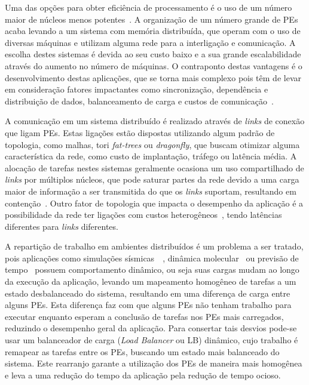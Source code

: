 \documentclass[
	12pt,				%
	openright,			%
	twoside,			%
	a4paper,			%
	english,			%
	brazil,				%
	]{abntex2}
\newcommand{\links}{\textit{links}\xspace}
\newcommand{\fatts}{\textit{fat-trees}\xspace}
\newcommand{\dgfly}{\textit{dragonfly}\xspace}
\begin{document}
Uma das opções para obter eficiência de processamento é o uso de um número maior de núcleos menos potentes~\cite{snir-encyclopedia}. A organização de um número grande de PEs acaba levando a um sistema com memória distribuída, que operam com o uso de diversas máquinas e utilizam alguma rede para a interligação e comunicação. A escolha destes sistemas é devida ao seu custo baixo e a sua grande escalabilidade através do aumento no número de máquinas. O contraponto destas vantagens é o desenvolvimento destas aplicações, que se torna mais complexo pois têm de levar em consideração fatores impactantes como sincronização, dependência e distribuição de dados, balanceamento de carga e custos de comunicação~\cite{pilla-thesis}.

A comunicação em um sistema distribuído é realizado através de \links de conexão que ligam PEs. Estas ligações estão dispostas utilizando algum padrão de topologia, como malhas, tori \fatts ou \dgfly, que buscam otimizar alguma característica da rede, como custo de implantação, tráfego ou latência média. A alocação de tarefas nestes sistemas geralmente ocasiona um uso compartilhado de \links por múltiplos núcleos, que pode saturar partes da rede devido a uma carga maior de informação a ser transmitida do que os \links suportam, resultando em contenção~\cite{bhatele-encyclopedia}. Outro fator de topologia que impacta o desempenho da aplicação é a possibilidade da rede ter ligações com custos heterogêneos~\cite{dragonfly}, tendo latências diferentes para \links diferentes.


A repartição de trabalho em ambientes distribuídos é um problema a ser tratado, pois aplicações como simulações sísmicas~\cite{dupros}~\cite{tesser}, dinâmica molecular~\cite{bhatele-kale} ou previsão de tempo~\cite{rodrigues} possuem comportamento dinâmico, ou seja suas cargas mudam ao longo da execução da aplicação, levando um mapeamento homogêneo de tarefas a um estado desbalanceado do sistema, resultando em uma diferença de carga entre alguns PEs. Esta diferença faz com que alguns PEs não tenham trabalho para executar enquanto esperam a conclusão de tarefas nos PEs mais carregados, reduzindo o desempenho geral da aplicação. Para consertar tais desvios pode-se usar um balanceador de carga (\textit{Load Balancer} ou LB) dinâmico, cujo trabalho é remapear as tarefas entre os PEs, buscando um estado mais balanceado do sistema. Este rearranjo garante a utilização dos PEs de maneira mais homogênea e leva a uma redução do tempo da aplicação pela redução de tempo ocioso.
\end{document}
